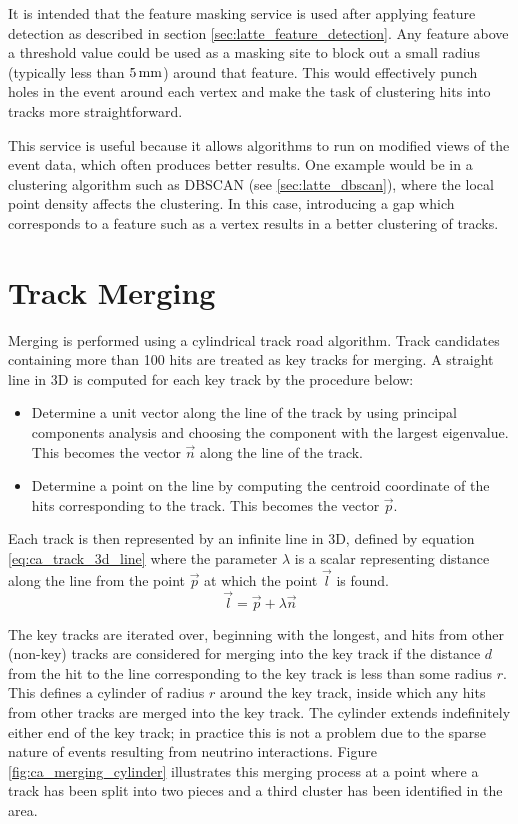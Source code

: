 It is intended that the feature masking service is used after applying feature detection as described in section \ref{sec:latte_feature_detection}. Any feature above a threshold value could be used as a masking site to block out a small radius (typically less than $5\,\mathrm{mm}$) around that feature. This would effectively punch holes in the event around each vertex and make the task of clustering hits into tracks more straightforward.

This service is useful because it allows algorithms to run on modified views of the event data, which often produces better results. One example would be in a clustering algorithm such as DBSCAN (see \ref{sec:latte_dbscan}), where the local point density affects the clustering. In this case, introducing a gap which corresponds to a feature such as a vertex results in a better clustering of tracks.

\section{Track Merging}\label{sec:cellularautomaton_merging}
Merging is performed using a cylindrical track road algorithm. Track candidates containing more than 100 hits are treated as key tracks for merging. A straight line in 3D is computed for each key track by the procedure below:

\begin{itemize}
	\item Determine a unit vector along the line of the track by using principal components analysis and choosing the component with the largest eigenvalue. This becomes the vector $\vec{n}$ along the line of the track.
	\item Determine a point on the line by computing the centroid coordinate of the hits corresponding to the track. This becomes the vector $\vec{p}$.
\end{itemize}

Each track is then represented by an infinite line in 3D, defined by equation \ref{eq:ca_track_3d_line} where the parameter $\lambda$ is a scalar representing distance along the line from the point $\vec{p}$ at which the point $\vec{l}$ is found.
\begin{equation}\label{eq:ca_track_3d_line}
\vec{l} = \vec{p} + \lambda \vec{n}
\end{equation}

The key tracks are iterated over, beginning with the longest, and hits from other (non-key) tracks are considered for merging into the key track if the distance $d$ from the hit to the line corresponding to the key track is less than some radius $r$. This defines a cylinder of radius $r$ around the key track, inside which any hits from other tracks are merged into the key track. The cylinder extends indefinitely either end of the key track; in practice this is not a problem due to the sparse nature of events resulting from neutrino interactions. Figure \ref{fig:ca_merging_cylinder} illustrates this merging process at a point where a track has been split into two pieces and a third cluster has been identified in the area.

